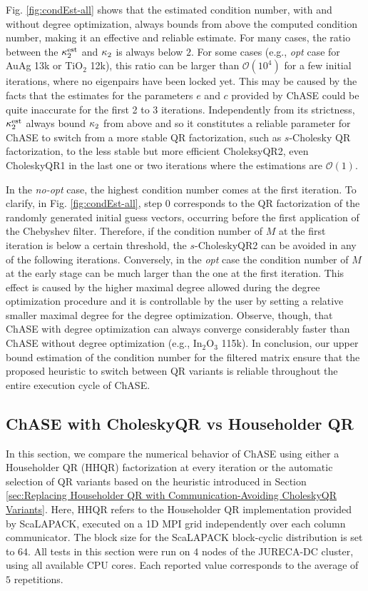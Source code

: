 Fig. \ref{fig:condEst-all} shows that the estimated condition number, with and without degree optimization, always bounds from above the computed condition number, making it an effective and reliable estimate. For many cases, the ratio between the $\mathop\mathrm{\kappa}_2^\mathrm{est}\nolimits$ and $\mathop\mathrm{\kappa}_2\nolimits$ is always below $2$. For some cases (e.g., {\it opt} case for AuAg 13k or TiO$_2$ 12k), this ratio can be larger than $\mathcal{O}(10^4)$ for a few initial iterations, where no eigenpairs have been locked yet. This may be caused by the facts that the estimates for the parameters $e$ and $c$ provided by ChASE could be quite inaccurate for the first 2 to 3 iterations. Independently from its strictness, $\mathop\mathrm{\kappa}_2^\mathrm{est}\nolimits$ always bound $\mathop\mathrm{\kappa}_2\nolimits$ from above and so it constitutes a reliable parameter for ChASE to switch from a more stable QR factorization, such as $s$-Cholesky QR factorization, to the less stable but more efficient CholeksyQR2, even CholeskyQR1 in the last one or two iterations where the estimations are $\mathcal{O}(1)$. 

In the {\it no-opt} case, the highest condition number comes at the first iteration. To clarify, in Fig. \ref{fig:condEst-all}, step $0$ corresponds to the QR factorization of the randomly generated initial guess vectors, occurring before the first application of the Chebyshev filter. Therefore, if the condition number of $M$ at the first iteration is below a certain threshold, the $s$-CholeskyQR2 can be avoided in any of the following iterations. Conversely, in the {\it opt} case the condition number of $M$ at the early stage can be much larger than the one at the first iteration. This effect is caused by the higher maximal degree allowed during the degree optimization procedure and it is controllable by the user by setting a relative smaller maximal degree for the degree optimization. Observe, though, that ChASE with degree optimization can always converge considerably faster than ChASE without degree optimization (e.g., In$_2$O$_3$ 115k). In conclusion, our upper bound estimation of the condition number for the filtered matrix ensure that the proposed heuristic to switch between QR variants is reliable throughout the entire execution cycle of ChASE. 

\subsection{ChASE with CholeskyQR vs Householder QR}

In this section, we compare the numerical behavior of ChASE using either a Householder QR (HHQR) factorization at every iteration or the automatic selection of QR variants based on the heuristic introduced in Section \ref{sec:Replacing Householder QR with Communication-Avoiding CholeskyQR Variants}. Here, HHQR refers to the Householder QR implementation provided by ScaLAPACK, executed on a 1D MPI grid independently over each column communicator. The block size for the ScaLAPACK block-cyclic distribution is set to $64$. All tests in this section were run on $4$ nodes of the JURECA-DC cluster, using all available CPU cores. Each reported value corresponds to the average of $5$ repetitions.

